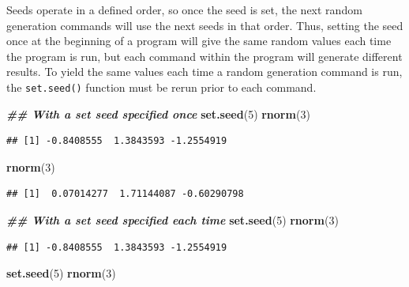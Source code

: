 \documentclass[
]{book}
\newenvironment{Shaded}{\begin{snugshade}}{\end{snugshade}}
\newcommand{\DecValTok}[1]{\textcolor[rgb]{0.00,0.00,0.81}{#1}}
\newcommand{\DocumentationTok}[1]{\textcolor[rgb]{0.56,0.35,0.01}{\textbf{\textit{#1}}}}
\newcommand{\FunctionTok}[1]{\textcolor[rgb]{0.13,0.29,0.53}{\textbf{#1}}}
\newcommand{\NormalTok}[1]{#1}
\theoremstyle{definition}
\theoremstyle{definition}
\theoremstyle{definition}
\theoremstyle{definition}
\theoremstyle{remark}
\begin{document}
Seeds operate in a defined order, so once the seed is set, the next random generation commands will use the next seeds in that order. Thus, setting the seed once at the beginning of a program will give the same random values each time the program is run, but each command within the program will generate different results. To yield the same values each time a random generation command is run, the \texttt{set.seed()} function must be rerun prior to each command.

\begin{Shaded}
\begin{Highlighting}[]
\DocumentationTok{\#\# With a set seed specified once}
\FunctionTok{set.seed}\NormalTok{(}\DecValTok{5}\NormalTok{)}
\FunctionTok{rnorm}\NormalTok{(}\DecValTok{3}\NormalTok{)}
\end{Highlighting}
\end{Shaded}

\begin{verbatim}
## [1] -0.8408555  1.3843593 -1.2554919
\end{verbatim}

\begin{Shaded}
\begin{Highlighting}[]
\FunctionTok{rnorm}\NormalTok{(}\DecValTok{3}\NormalTok{)}
\end{Highlighting}
\end{Shaded}

\begin{verbatim}
## [1]  0.07014277  1.71144087 -0.60290798
\end{verbatim}

\begin{Shaded}
\begin{Highlighting}[]
\DocumentationTok{\#\# With a set seed specified each time}
\FunctionTok{set.seed}\NormalTok{(}\DecValTok{5}\NormalTok{)}
\FunctionTok{rnorm}\NormalTok{(}\DecValTok{3}\NormalTok{)}
\end{Highlighting}
\end{Shaded}

\begin{verbatim}
## [1] -0.8408555  1.3843593 -1.2554919
\end{verbatim}

\begin{Shaded}
\begin{Highlighting}[]
\FunctionTok{set.seed}\NormalTok{(}\DecValTok{5}\NormalTok{)}
\FunctionTok{rnorm}\NormalTok{(}\DecValTok{3}\NormalTok{)}
\end{Highlighting}
\end{Shaded}
\end{document}

